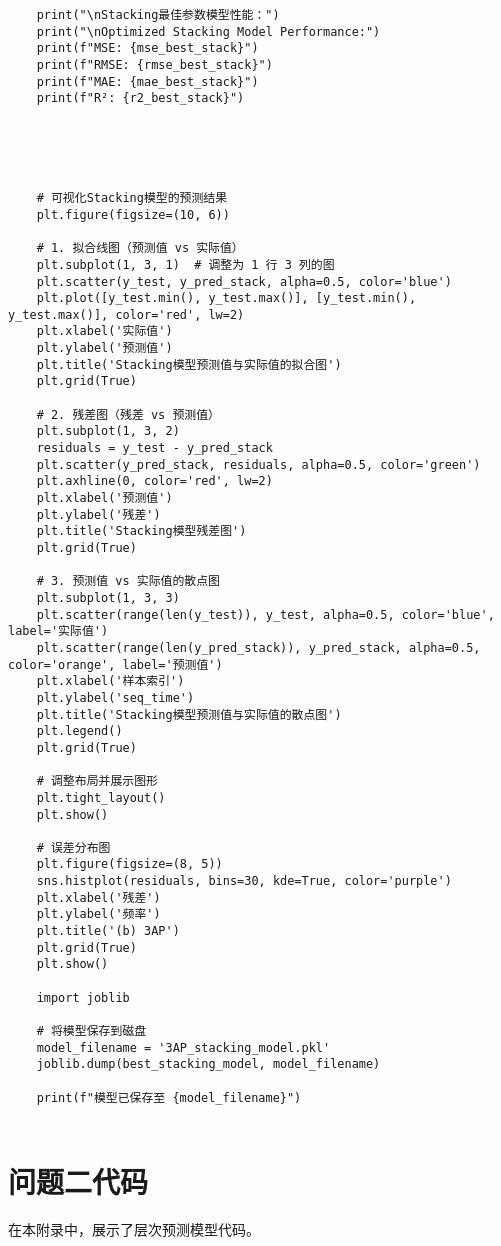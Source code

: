\documentclass[bwprint,fontset=windows]{gmcmthesis}
\begin{document}
\begin{lstlisting}
	print("\nStacking最佳参数模型性能：")
	print("\nOptimized Stacking Model Performance:")
	print(f"MSE: {mse_best_stack}")
	print(f"RMSE: {rmse_best_stack}")
	print(f"MAE: {mae_best_stack}")
	print(f"R²: {r2_best_stack}")
	
	
	
	
	
	# 可视化Stacking模型的预测结果
	plt.figure(figsize=(10, 6))
	
	# 1. 拟合线图（预测值 vs 实际值）
	plt.subplot(1, 3, 1)  # 调整为 1 行 3 列的图
	plt.scatter(y_test, y_pred_stack, alpha=0.5, color='blue')
	plt.plot([y_test.min(), y_test.max()], [y_test.min(), y_test.max()], color='red', lw=2)
	plt.xlabel('实际值')
	plt.ylabel('预测值')
	plt.title('Stacking模型预测值与实际值的拟合图')
	plt.grid(True)
	
	# 2. 残差图（残差 vs 预测值）
	plt.subplot(1, 3, 2)
	residuals = y_test - y_pred_stack
	plt.scatter(y_pred_stack, residuals, alpha=0.5, color='green')
	plt.axhline(0, color='red', lw=2)
	plt.xlabel('预测值')
	plt.ylabel('残差')
	plt.title('Stacking模型残差图')
	plt.grid(True)
	
	# 3. 预测值 vs 实际值的散点图
	plt.subplot(1, 3, 3)
	plt.scatter(range(len(y_test)), y_test, alpha=0.5, color='blue', label='实际值')
	plt.scatter(range(len(y_pred_stack)), y_pred_stack, alpha=0.5, color='orange', label='预测值')
	plt.xlabel('样本索引')
	plt.ylabel('seq_time')
	plt.title('Stacking模型预测值与实际值的散点图')
	plt.legend()
	plt.grid(True)
	
	# 调整布局并展示图形
	plt.tight_layout()
	plt.show()
	
	# 误差分布图
	plt.figure(figsize=(8, 5))
	sns.histplot(residuals, bins=30, kde=True, color='purple')
	plt.xlabel('残差')
	plt.ylabel('频率')
	plt.title('(b) 3AP')
	plt.grid(True)
	plt.show()
	
	import joblib
	
	# 将模型保存到磁盘
	model_filename = '3AP_stacking_model.pkl'
	joblib.dump(best_stacking_model, model_filename)
	
	print(f"模型已保存至 {model_filename}")
	
\end{lstlisting}




\section{问题二代码}
\noindent 在本附录中，展示了层次预测模型代码。
\end{document}
